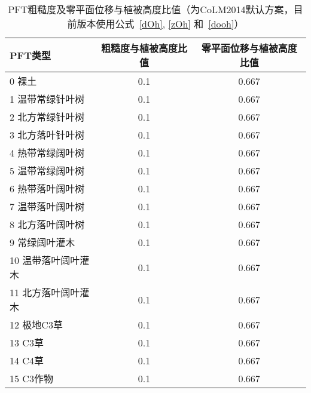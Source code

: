 \begin{table}[htbp]
  \centering
  \caption[PFT粗糙度及零平面位移与植被高度比值]{PFT粗糙度及零平面位移与植被高度比值（为CoLM2014默认方案，目前版本使用公式~\eqref{dOh}, \eqref{zOh} 和~\eqref{dooh}）}
  \label{tab:PFT粗糙度及零平面位移与植被高度比值}
  \begin{tabular}{@{}lcc@{}}
    \toprule
    PFT类型             & 粗糙度与植被高度比值 & 零平面位移与植被高度比值 \\ \midrule
    0 裸土              & 0.1                  & 0.667                    \\
    1 温带常绿针叶树    & 0.1                  & 0.667                    \\
    2 北方常绿针叶树    & 0.1                  & 0.667                    \\
    3 北方落叶针叶树    & 0.1                  & 0.667                    \\
    4 热带常绿阔叶树    & 0.1                  & 0.667                    \\
    5 温带常绿阔叶树    & 0.1                  & 0.667                    \\
    6 热带落叶阔叶树    & 0.1                  & 0.667                    \\
    7 温带落叶阔叶树    & 0.1                  & 0.667                    \\
    8 北方落叶阔叶树    & 0.1                  & 0.667                    \\
    9 常绿阔叶灌木      & 0.1                  & 0.667                    \\
    10 温带落叶阔叶灌木 & 0.1                  & 0.667                    \\
    11 北方落叶阔叶灌木 & 0.1                  & 0.667                    \\
    12 极地C3草         & 0.1                  & 0.667                    \\
    13 C3草             & 0.1                  & 0.667                    \\
    14 C4草             & 0.1                  & 0.667                    \\
    15 C3作物           & 0.1                  & 0.667                    \\ \bottomrule
  \end{tabular}
\end{table}



